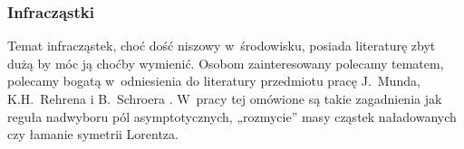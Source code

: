 \documentclass[10pt,t]{beamer}
\begin{document}
\begin{frame}
  \frametitle{Infracząstki}


  Temat infracząstek, choć dość niszowy w~środowisku, posiada literaturę
  zbyt dużą by móc ją choćby wymienić. Osobom zainteresowany polecamy
  tematem, polecamy bogatą w~odniesienia do literatury przedmiotu pracę
  J.~Munda, K.H.~Rehrena i B.~Schroera
  \parencite{Mund-Rehren-Schroer-Infraparticle-quantum-fiels-ETC-Pub-2022}.
  W~pracy tej omówione są takie zagadnienia jak reguła nadwyboru pól
  asymptotycznych, „rozmycie” masy cząstek naładowanych czy łamanie
  symetrii Lorentza.

\end{frame}














\end{document}
